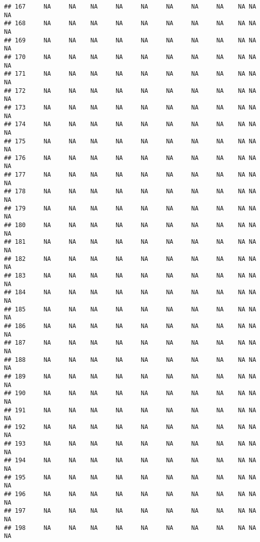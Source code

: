 \documentclass[]{article}
\begin{document}
\begin{verbatim}
## 167     NA     NA    NA     NA     NA     NA     NA     NA    NA NA          NA
## 168     NA     NA    NA     NA     NA     NA     NA     NA    NA NA          NA
## 169     NA     NA    NA     NA     NA     NA     NA     NA    NA NA          NA
## 170     NA     NA    NA     NA     NA     NA     NA     NA    NA NA          NA
## 171     NA     NA    NA     NA     NA     NA     NA     NA    NA NA          NA
## 172     NA     NA    NA     NA     NA     NA     NA     NA    NA NA          NA
## 173     NA     NA    NA     NA     NA     NA     NA     NA    NA NA          NA
## 174     NA     NA    NA     NA     NA     NA     NA     NA    NA NA          NA
## 175     NA     NA    NA     NA     NA     NA     NA     NA    NA NA          NA
## 176     NA     NA    NA     NA     NA     NA     NA     NA    NA NA          NA
## 177     NA     NA    NA     NA     NA     NA     NA     NA    NA NA          NA
## 178     NA     NA    NA     NA     NA     NA     NA     NA    NA NA          NA
## 179     NA     NA    NA     NA     NA     NA     NA     NA    NA NA          NA
## 180     NA     NA    NA     NA     NA     NA     NA     NA    NA NA          NA
## 181     NA     NA    NA     NA     NA     NA     NA     NA    NA NA          NA
## 182     NA     NA    NA     NA     NA     NA     NA     NA    NA NA          NA
## 183     NA     NA    NA     NA     NA     NA     NA     NA    NA NA          NA
## 184     NA     NA    NA     NA     NA     NA     NA     NA    NA NA          NA
## 185     NA     NA    NA     NA     NA     NA     NA     NA    NA NA          NA
## 186     NA     NA    NA     NA     NA     NA     NA     NA    NA NA          NA
## 187     NA     NA    NA     NA     NA     NA     NA     NA    NA NA          NA
## 188     NA     NA    NA     NA     NA     NA     NA     NA    NA NA          NA
## 189     NA     NA    NA     NA     NA     NA     NA     NA    NA NA          NA
## 190     NA     NA    NA     NA     NA     NA     NA     NA    NA NA          NA
## 191     NA     NA    NA     NA     NA     NA     NA     NA    NA NA          NA
## 192     NA     NA    NA     NA     NA     NA     NA     NA    NA NA          NA
## 193     NA     NA    NA     NA     NA     NA     NA     NA    NA NA          NA
## 194     NA     NA    NA     NA     NA     NA     NA     NA    NA NA          NA
## 195     NA     NA    NA     NA     NA     NA     NA     NA    NA NA          NA
## 196     NA     NA    NA     NA     NA     NA     NA     NA    NA NA          NA
## 197     NA     NA    NA     NA     NA     NA     NA     NA    NA NA          NA
## 198     NA     NA    NA     NA     NA     NA     NA     NA    NA NA          NA

\end{verbatim}
\end{document}

